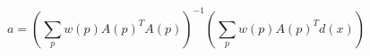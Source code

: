 \begin{equation}
    \label{eq:optimal-parameter-affine-weighted}
    a = \left (\sum_p w(p) A(p)^T A(p) \right )^{-1} \left (\sum_p w(p) A(p)^T d(x) \right)
\end{equation}